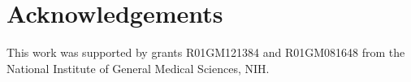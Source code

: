 
\section*{Acknowledgements}

This work was supported by grants R01GM121384 and R01GM081648 from the National Institute of General Medical Sciences, NIH.

\begin{comment}

methods experimentl data part
Discussion 
Remake figures with new program 6, 7, 5h, 3,5 update
Spreadsheets (scripts)
Spreadsheet key
Add missing references
literature review
get larry to read

--potentially after submission --
Software (is it required before submission?)
Installation ducomentation
Use documentation
More datasets
Use larry

--on publication --
Data archive

\end{comment}

